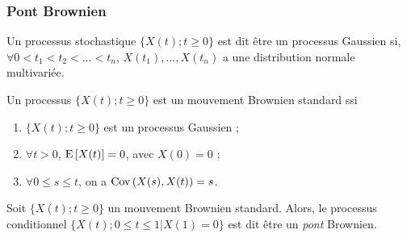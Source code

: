 \documentclass[10pt, french, landscape]{article}
\begin{document}
\begin{multicols*}{3}
\subsubsection*{Pont Brownien}
\begin{definition}
Un processus stochastique $\{X(t) ; t \geq 0 \}$ est dit être un processus Gaussien si, $\forall 0 < t_1 < t_2 < ... < t_n$, $X(t_1), ..., X(t_n)$ a une distribution normale multivariée.
\end{definition}

\begin{definition}
Un processus $\{X(t) ; t \geq 0 \}$ est un mouvement Brownien standard ssi
\begin{enumerate}[label=(\arabic*)]
\item $\{X(t) ; t \geq 0 \}$ est un processus Gaussien ;
\item $\forall t > 0$, $\mathrm{E} \left[ X(t) \right] = 0$, avec $X(0) = 0$ ;
\item $\forall 0 \leq s \leq t$, on a $\mathrm{Cov} \left( X(s), X(t) \right) = s$.
\end{enumerate}
\end{definition}

\begin{definition}
Soit $\{X(t) ; t \geq 0 \}$ un mouvement Brownien standard. Alors, le processus conditionnel $\{X(t) ; 0 \leq t \leq 1 | X(1) = 0 \}$ est dit être un \emph{pont} Brownien.
\end{definition}














\end{multicols*}

\end{document}
